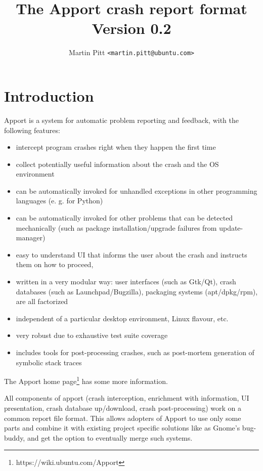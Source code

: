 \documentclass[DIV12,halfparskip]{scrartcl}
\title{The Apport crash report format\\
  \vspace{1ex}\large Version 0.2}
\author{Martin Pitt \texttt{<martin.pitt@ubuntu.com>}}
\begin{document}
\maketitle

\tableofcontents

\newpage
\section{Introduction}

Apport is a system for automatic problem reporting and feedback, with the
following features:

\begin{itemize}
    \item intercept program crashes right when they happen the first time
    \item collect potentially useful information about the crash and the OS environment
    \item can be automatically invoked for unhandled exceptions in other programming languages (e. g. for Python)
    \item can be automatically invoked for other problems that can be
        detected mechanically (such as package installation/upgrade failures from update-manager)
    \item easy to understand UI that informs the user about the crash and instructs them on how to proceed,
    \item written in a very modular way: user interfaces (such as Gtk/Qt),
    crash databases (such as Launchpad/Bugzilla), packaging systems
    (apt/dpkg/rpm), are all factorized
    \item independent of a particular desktop environment, Linux flavour, etc.
    \item very robust due to exhaustive test suite coverage
    \item includes tools for post-processing crashes, such as post-mortem
    generation of symbolic stack traces
\end{itemize}

The Apport home page\footnote{https://wiki.ubuntu.com/Apport} has some more
information.

All components of apport (crash interception, enrichment with information, UI
presentation, crash database up/download, crash post-processing) work on a
common report file format. This allows adopters of Apport to use only some
parts and combine it with existing project specific solutions like as Gnome's
bug-buddy, and get the option to eventually merge such systems.
\end{document}
